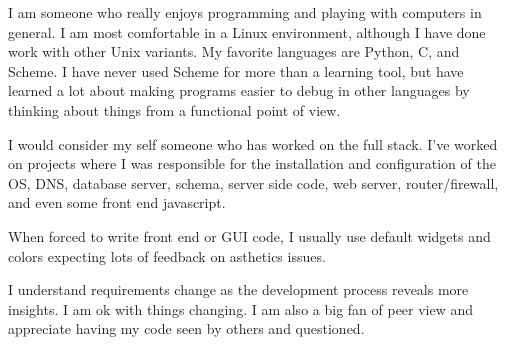 I am someone who really enjoys programming and playing with computers
in general.  I am most comfortable in a Linux environment, although
I have done work with other Unix variants.  My favorite languages are
Python, C, and Scheme.  I have never used Scheme for more than a
learning tool, but have learned a lot about making programs easier
to debug in other languages by thinking about things from a functional
point of view.

I would consider my self someone who has worked on the full stack.  I've
worked on projects where I was responsible for the installation and
configuration of the OS, DNS, database server, schema, server side code,
web server, router/firewall, and even some front end javascript.

When forced to write front end or GUI code, I usually use default
widgets and colors expecting lots of feedback on asthetics issues.

I understand requirements change as the development process
reveals more insights.  I am ok with things changing.  I am also a big
fan of peer view and appreciate having my code seen by others and questioned.


